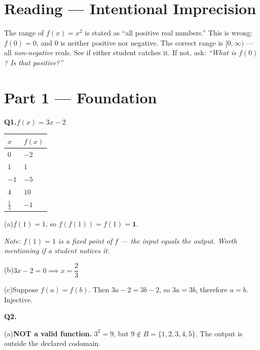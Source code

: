 \documentclass[12pt]{article}
\begin{document}
\section*{Reading --- Intentional Imprecision}

The range of $f(x) = x^2$ is stated as ``all positive real numbers.''
This is wrong: $f(0) = 0$, and $0$ is neither positive nor negative.
The correct range is $[0, \infty)$ --- all \textit{non-negative} reals.
See if either student catches it. If not, ask: \textit{``What is $f(0)$?
Is that positive?''}

\section*{Part 1 --- Foundation}

\textbf{Q1.}\quad $f(x) = 3x - 2$

\medskip
\begin{center}
\renewcommand{\arraystretch}{1.6}
\begin{tabular}{|C{2.5cm}|C{2.5cm}|}
\hline
$x$ & $f(x)$ \\
\hline
$0$           & $-2$ \\ \hline
$1$           & $1$  \\ \hline
$-1$          & $-5$ \\ \hline
$4$           & $10$ \\ \hline
$\frac{1}{3}$ & $-1$ \\ \hline
\end{tabular}
\renewcommand{\arraystretch}{1}
\end{center}

\medskip
(a)\quad $f(1) = 1$, so $f\!\left(f(1)\right) = f(1) = \mathbf{1}$.

\textit{Note: $f(1) = 1$ is a fixed point of $f$ --- the input equals the output.
Worth mentioning if a student notices it.}

\medskip
(b)\quad $3x - 2 = 0 \implies x = \dfrac{2}{3}$

\medskip
(c)\quad Suppose $f(a) = f(b)$. Then $3a - 2 = 3b - 2$, so $3a = 3b$,
therefore $a = b$. Injective. \checkmark

\bigskip
\textbf{Q2.}

(a)\quad \textbf{NOT a valid function.} $3^2 = 9$, but $9 \notin B = \{1,2,3,4,5\}$.
The output is outside the declared codomain.
\end{document}
